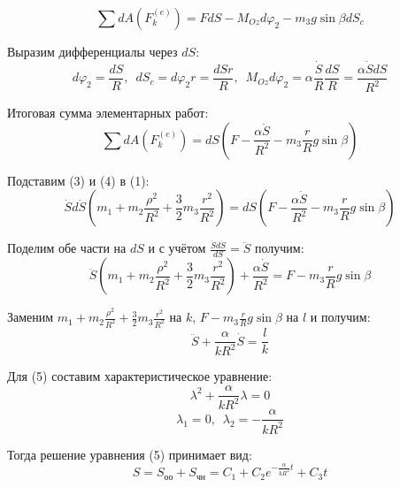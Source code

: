 \documentclass{article}
\begin{document}
\begin{equation*}
	\sum dA(F_k^{(e)}) = F dS - M_{Oz} d\varphi_2 - m_3 g \sin\beta dS_c
\end{equation*}
\par
Выразим дифференциалы через $dS$:
\begin{equation*}
	d\varphi_2 = \frac{dS}{R}, \,\,\, dS_c = d\varphi_2r = \frac{dSr}{R}, \,\,\, M_{Oz}d\varphi_2 = \alpha\frac{\dot{S}}{R}\frac{dS}{R} = \frac{\alpha\dot{S}dS}{R^2}
\end{equation*}
\par
Итоговая сумма элементарных работ:
\begin{equation}
	\sum dA(F_k^{(e)}) = dS \left( F - \frac{\alpha \dot{S}}{R^2} - m_3 \frac{r}{R} g \sin\beta \right)
\end{equation}
\par
Подставим (3) и (4) в (1):
\begin{equation*}
	\dot{S} d\dot{S} \left( m_1 + m_2 \frac{\rho^2}{R^2} + \frac{3}{2} m_3 \frac{r^2}{R^2} \right) = dS \left( F - \frac{\alpha \dot{S}}{R^2} - m_3 \frac{r}{R} g \sin\beta \right)
\end{equation*}
\par
Поделим обе части на $dS$ и с учётом $\frac{\dot{S}d\dot{S}}{dS} = \ddot{S}$ получим:
\begin{equation*}
	\ddot{S} \left( m_1 + m_2 \frac{\rho^2}{R^2} + \frac{3}{2} m_3 \frac{r^2}{R^2} \right) + \frac{\alpha\dot{S}}{R^2} = F - m_3 \frac{r}{R} g \sin\beta
\end{equation*}
\par
Заменим $m_1 + m_2 \frac{\rho^2}{R^2} + \frac{3}{2} m_3 \frac{r^2}{R^2}$ на $k$, $F - m_3 \frac{r}{R} g \sin\beta$ на $l$ и получим:
\begin{equation}
	\ddot{S} + \frac{\alpha}{kR^2}\dot{S} = \frac{l}{k}
\end{equation}
\par
Для (5) составим характеристическое уравнение:
\begin{equation*}
	\lambda^2 + \frac{\alpha}{kR^2}\lambda = 0
\end{equation*}
\begin{equation*}
	\lambda_1 = 0, \,\,\, \lambda_2 = -\frac{\alpha}{kR^2}
\end{equation*}
\par
Тогда решение уравнения (5) принимает вид:
\begin{equation*}
	S = S_{\text{оо}} + S_{\text{чн}} = C_1 + C_2e^{-\frac{\alpha}{kR^2}t} + C_3t
\end{equation*}
\end{document}
